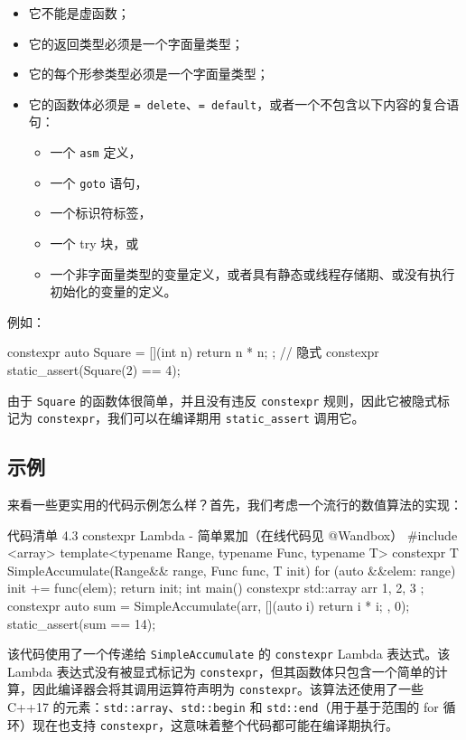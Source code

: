 \begin{itemize}
\item 它不能是虚函数；
\item 它的返回类型必须是一个字面量类型；
\item 它的每个形参类型必须是一个字面量类型；
\item 它的函数体必须是 \texttt{= delete}、\texttt{= default}，或者一个不包含以下内容的复合语句：
  \begin{itemize}
  \item 一个 \texttt{asm} 定义，
  \item 一个 \texttt{goto} 语句，
  \item 一个标识符标签，
  \item 一个 try 块，或
  \item 一个非字面量类型的变量定义，或者具有静态或线程存储期、或没有执行初始化的变量的定义。
  \end{itemize}
\end{itemize}

例如：

\begin{codebox}
constexpr auto Square = [](int n) { return n * n; }; // 隐式 constexpr
static_assert(Square(2) == 4);
\end{codebox}

由于 \texttt{Square} 的函数体很简单，并且没有违反 \texttt{constexpr} 规则，因此它被隐式标记为 \texttt{constexpr}，我们可以在编译期用 \texttt{static\_assert} 调用它。

\subsection{示例}

来看一些更实用的代码示例怎么样？首先，我们考虑一个流行的数值算法的实现：

\begin{codeboxt}{代码清单 4.3 constexpr Lambda - 简单累加（在线代码见 @Wandbox）}
#include <array>
template<typename Range, typename Func, typename T>
constexpr T SimpleAccumulate(Range&& range, Func func, T init) {
for (auto &&elem: range) {
init += func(elem);
}
return init;
}
int main() {
constexpr std::array arr{ 1, 2, 3 };
constexpr auto sum = SimpleAccumulate(arr, [](auto i) {
return i * i;
}, 0);
static_assert(sum == 14);
}
\end{codeboxt}

该代码使用了一个传递给 \texttt{SimpleAccumulate} 的 \texttt{constexpr} Lambda 表达式。该 Lambda 表达式没有被显式标记为 \texttt{constexpr}，但其函数体只包含一个简单的计算，因此编译器会将其调用运算符声明为 \texttt{constexpr}。该算法还使用了一些 C++17 的元素：\texttt{std::array}、\texttt{std::begin} 和 \texttt{std::end}（用于基于范围的 for 循环）现在也支持 \texttt{constexpr}，这意味着整个代码都可能在编译期执行。

